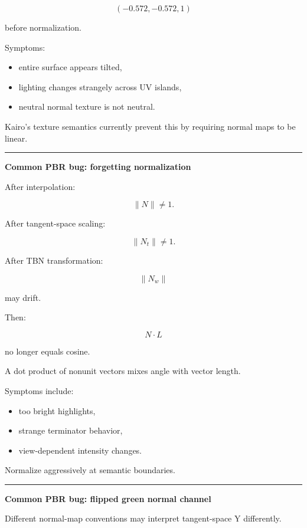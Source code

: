 \[
(-0.572,-0.572,1)
\]

before normalization.

Symptoms:

\begin{itemize}
\tightlist
\item
  entire surface appears tilted,
\item
  lighting changes strangely across UV islands,
\item
  neutral normal texture is not neutral.
\end{itemize}

Kairo's texture semantics currently prevent this by requiring normal maps to be linear.

\begin{center}\rule{0.5\linewidth}{0.5pt}\end{center}

\textbf{Common PBR bug: forgetting normalization}

After interpolation:

\[
\|N\|\neq1.
\]

After tangent-space scaling:

\[
\|N_t\|\neq1.
\]

After TBN transformation:

\[
\|N_w\|
\]

may drift.

Then:

\[
N\cdot L
\]

no longer equals cosine.

A dot product of nonunit vectors mixes angle with vector length.

Symptoms include:

\begin{itemize}
\tightlist
\item
  too bright highlights,
\item
  strange terminator behavior,
\item
  view-dependent intensity changes.
\end{itemize}

Normalize aggressively at semantic boundaries.

\begin{center}\rule{0.5\linewidth}{0.5pt}\end{center}

\textbf{Common PBR bug: flipped green normal channel}

Different normal-map conventions may interpret tangent-space Y differently.

